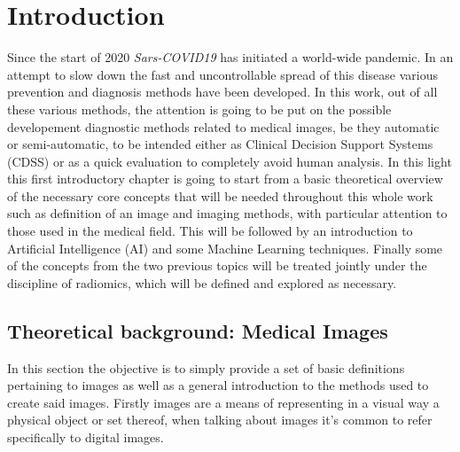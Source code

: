 \chapter{Introduction}
\vspace*{0.5cm}
\setcounter{page}{1}

Since the start of 2020 \textit{Sars-COVID19} has initiated a world-wide pandemic. In an attempt to slow down the fast and uncontrollable spread of this disease various prevention and diagnosis methods have been developed. In this work, out of all these various methods, the attention is going to be put on the possible developement diagnostic methods related to medical images, be they automatic or semi-automatic, to be intended either as Clinical Decision Support Systems (CDSS) or as a quick evaluation to completely avoid human analysis.
In this light this first introductory chapter is going to start from a basic theoretical overview of the necessary core concepts that will be needed throughout this whole work such as definition of an image and imaging methods, with particular attention to those used in the medical field. This will be followed by an introduction to Artificial Intelligence (AI) and some Machine Learning techniques. Finally some of the concepts from the two previous topics will be treated jointly under the discipline of radiomics, which will be defined and explored as necessary.

\section{Theoretical background: Medical Images}
In this section the objective is to simply provide a set of basic definitions pertaining to images as well as a general introduction to the methods used to create said images. Firstly images are a means of representing in a visual way a physical object or set thereof, when talking about images it's common to refer specifically to digital images.


